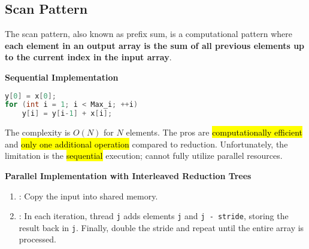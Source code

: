 \subsection{Scan Pattern}

The scan pattern, also known as prefix sum, is a computational pattern where \textbf{each element in an output array is the sum of all previous elements up to the current index in the input array}.

\highspace
\begin{flushleft}
    \textcolor{Green3}{ \textbf{Sequential Implementation}}
\end{flushleft}
\begin{lstlisting}[language=c++]
y[0] = x[0];
for (int i = 1; i < Max_i; ++i)
    y[i] = y[i-1] + x[i];\end{lstlisting}
The complexity is $O(N)$ for $N$ elements. The \textcolor{Green3}{pros} are \hl{computationally efficient} and \hl{only one additional operation} compared to reduction. Unfortunately, the \textcolor{Red2}{limitation} is the \hl{sequential} execution; cannot fully utilize parallel resources.

\highspace
\begin{flushleft}
    \textcolor{Green3}{ \textbf{Parallel Implementation with Interleaved Reduction Trees}}
\end{flushleft}
\begin{enumerate}
    \item {}: Copy the input into shared memory.
    \item {}: In each iteration, thread \texttt{j} adds elements \texttt{j} and \texttt{j - stride}, storing the result back in \texttt{j}. Finally, double the stride and repeat until the entire array is processed.
\end{enumerate}

